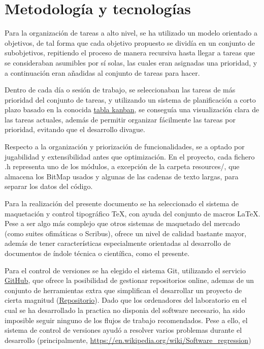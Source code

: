 \documentclass[12pt,letterpaper]{article}
\begin{document}
\section{Metodología y tecnologías}
\label{sec:metodologias-tecnologias}
\label{sec:metodologias}
\label{sec:tecnologias}
Para la organización de tareas a alto nivel, se ha utilizado un modelo
orientado a objetivos, de tal forma que cada objetivo propuesto se
dividía en un conjunto de subobjetivos, repitiendo el proceso de
manera recursiva hasta llegar a tareas que se consideraban asumibles
por sí solas, las cuales eran asignadas una prioridad, y a
continuación eran añadidas al conjunto de tareas para hacer.

Dentro de cada día o sesión de trabajo, se seleccionaban las tareas de
más prioridad del conjunto de tareas, y utilizando un sistema de
planificación a corto plazo basado en la conocida
\href{https://en.wikipedia.org/wiki/Kanban\_board}{tabla kanban}, se
conseguía una visualización clara de las tareas actuales, además de
permitir organizar fácilmente las tareas por prioridad, evitando que
el desarrollo divague.

Respecto a la organización y priorización de funcionalidades, se a
optado por jugabilidad y extensibilidad antes que optimización. En el
proyecto, cada fichero .h representa uno de los módulos, a excepción
de la carpeta resources/, que almacena los BitMap usados y algunas de
las cadenas de texto largas, para separar los datos del código.

Para la realización del presente documento se ha seleccionado el
sistema de maquetación y control tipográfico \TeX, con ayuda del
conjunto de macros \LaTeX. Pese a ser algo más complejo que otros
sistemas de maquetado del mercado (como suites ofimáticas o Scribus),
ofrece un nivel de calidad bastante mayor, además de tener
características especialmente orientadas al desarrollo de documentos
de índole técnica o científica, como el presente.

Para el control de versiones se ha elegido el sistema Git, utilizando
el servicio \href{https://www.github.com}{GitHub}, que ofrece la
posibilidad de gestionar repositorios online, ademas de un conjunto de
herramientas extra que simplifican el desarrollar un proyecto de
cierta magnitud
(\href{https://www.github.com/wynro/proyecto\_hardware}{Repositorio}). Dado
que los ordenadores del laboratorio en el cual se ha desarrollado la
practica no disponia del software necesario, ha sido imposible seguir
ninguno de los flujos de trabajo recomendados. Pese a ello, el sistema
de control de versiones ayudó a resolver varios problemas durante el
desarrollo (principalmente, \href{regresiones de
  software}{https://en.wikipedia.org/wiki/Software\_regression})
\end{document}
